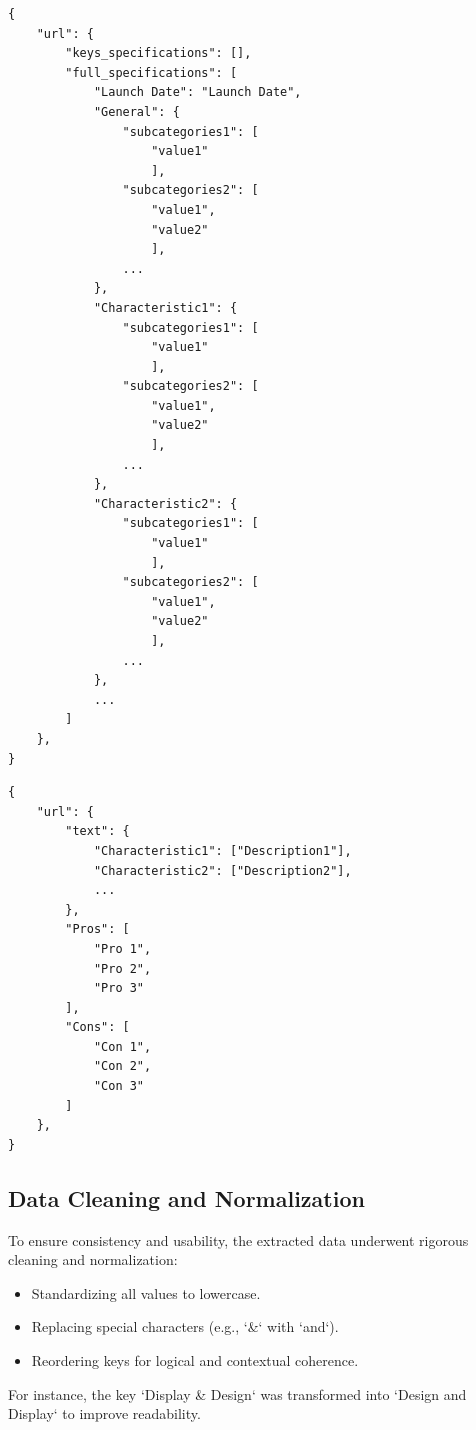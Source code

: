 \newpage
\begin{lstlisting}[style=jsonstyle, frame = single, caption=JSON Data Format Product specification, label=code:json-data-format]
{
    "url": {
        "keys_specifications": [],
        "full_specifications": [
            "Launch Date": "Launch Date",
            "General": {
                "subcategories1": [
                    "value1"
                    ],
                "subcategories2": [
                    "value1",
                    "value2"
                    ],
                ...
            },
            "Characteristic1": {
                "subcategories1": [
                    "value1"
                    ],
                "subcategories2": [
                    "value1",
                    "value2"
                    ],
                ...
            },
            "Characteristic2": {
                "subcategories1": [
                    "value1"
                    ],
                "subcategories2": [
                    "value1",
                    "value2"
                    ],
                ...
            },
            ...
        ]
    },
}
\end{lstlisting}
\newpage
\begin{lstlisting}[style=jsonstyle, frame = single, caption=JSON Data Format reviews, label=code:json-review-format]
{
    "url": {
        "text": {
            "Characteristic1": ["Description1"],
            "Characteristic2": ["Description2"],
            ...
        },
        "Pros": [
            "Pro 1",
            "Pro 2",
            "Pro 3"
        ],
        "Cons": [
            "Con 1",
            "Con 2",
            "Con 3"
        ]
    },
}
\end{lstlisting}

\subsection{Data Cleaning and Normalization}
To ensure consistency and usability, the extracted data underwent rigorous cleaning and normalization:
\begin{itemize}
    \item Standardizing all values to lowercase.
    \item Replacing special characters (e.g., `\&` with `and`).
    \item Reordering keys for logical and contextual coherence.
\end{itemize}
For instance, the key `Display \& Design` was transformed into `Design and Display` to improve readability.

